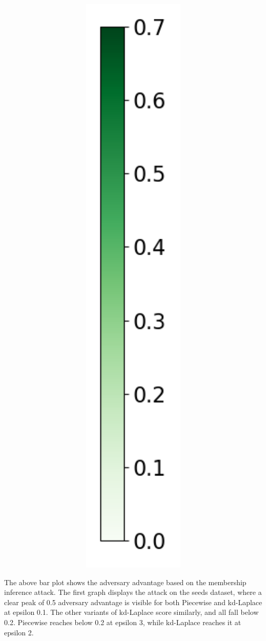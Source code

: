 \begin{figure}[H]
\begin{subfigure}[b]{0.075\textwidth}
        \includegraphics[width=1\textwidth]{Results/kd-laplace/kd-Laplace/seeds-dataset/heatmap_legend_shokri_mi_adv.png}
    \end{subfigure}
\end{figure}
The above bar plot shows the adversary advantage based on the membership inference attack. The first graph displays the attack on the seeds dataset, where a clear peak of 0.5 adversary advantage is visible for both Piecewise and kd-Laplace at epsilon 0.1. The other variants of kd-Laplace score similarly, and all fall below 0.2. Piecewise reaches below 0.2 at epsilon 3, while kd-Laplace reaches it at epsilon 2.

